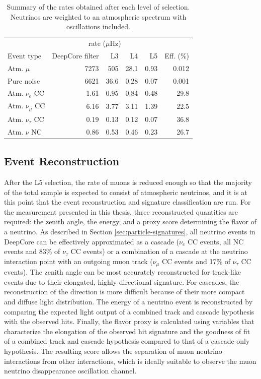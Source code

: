 \begin{table}
\caption{Summary of the rates obtained after each level of selection. Neutrinos are weighted to an atmospheric spectrum with oscillations included.}
\label{tab:l5_summary}
\begin{tabular}{lrrrrr}\toprule
& \multicolumn{4}{c}{rate ($\mu$Hz)} & \\ \cmidrule{2-5}
Event type  & DeepCore filter   & L3   & L4   & L5   & Eff. (\%) \\
\toprule
Atm. $\mu$         & 7273 & 505  & 28.1 & 0.93 & 0.012          \\
Pure noise         & 6621 & 36.6 & 0.28 & 0.07 & 0.001          \\
Atm. $\nu_e$ CC    & 1.61 & 0.95 & 0.84 & 0.48 & 29.8           \\
Atm. $\nu_\mu$ CC  & 6.16 & 3.77 & 3.11 & 1.39 & 22.5           \\
Atm. $\nu_\tau$ CC & 0.19 & 0.13 & 0.12 & 0.07 & 36.8           \\
Atm. $\nu$ NC      & 0.86 & 0.53 & 0.46 & 0.23 & 26.7  \\
\bottomrule
\end{tabular}
\end{table}

\subsection{Event Reconstruction}
\label{sec:event-reconstruction}

After the L5 selection, the rate of muons is reduced enough so that the majority of the total sample is expected to consist of atmospheric neutrinos, and it is at this point that the event reconstruction and signature classification are run.
For the measurement presented in this thesis, three reconstructed quantities are required: the zenith angle, the energy, and a proxy score determining the flavor of a neutrino.
As described in Section \ref{sec:particle-signatures}, all neutrino events in DeepCore can be effectively approximated as a cascade ($\nu_e$ CC events, all NC events and 83\% of $\nu_\tau$ CC events) or a combination of a cascade at the neutrino interaction point with an outgoing muon track ($\nu_\mu$ CC events and 17\% of $\nu_\tau$ CC events).
The zenith angle can be most accurately reconstructed for track-like events due to their elongated, highly directional signature.
For cascades, the reconstruction of the direction is more difficult because of their more compact and diffuse light distribution.
The energy of a neutrino event is reconstructed by comparing the expected light output of a combined track and cascade hypothesis with the observed hits.
Finally, the flavor proxy is calculated using variables that characterize the elongation of the observed hit signature and the goodness of fit of a combined track and cascade hypothesis compared to that of a cascade-only hypothesis.
The resulting score allows the separation of muon neutrino interactions from other interactions, which is ideally suitable to observe the muon neutrino disappearance oscillation channel.

